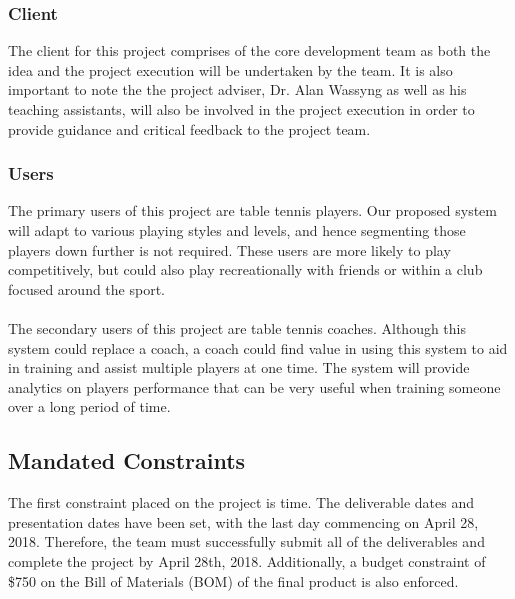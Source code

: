 \documentclass[11pt]{article}
\begin{document}
\subsubsection{Client}
The client for this project comprises of the core development team as both the idea and the project execution will be undertaken by the team. It is also important to note the the project adviser, Dr. Alan Wassyng as well as his teaching assistants, will also be involved in the project execution in order to provide guidance and critical feedback to the project team.
\subsubsection{Users}
The primary users of this project are table tennis players. Our proposed system will adapt to various playing styles and levels, and hence segmenting those players down further is not required. These users are more likely to play competitively, but could also play recreationally with friends or within a club focused around the sport. \\\\
The secondary users of this project are table tennis coaches. Although this system could replace a coach, a coach could find value in using this system to aid in training and assist multiple players at one time. The system will provide analytics on players performance that can be very useful when training someone over a long period of time.
\subsection{Mandated Constraints}
The first constraint placed on the project is time. The deliverable dates and presentation dates have been set, with the last day commencing on April 28, 2018. Therefore, the team must successfully submit all of the deliverables and complete the project by April 28th, 2018. Additionally, a budget constraint of \$750 on the Bill of Materials (BOM) of the final product is also enforced.
\end{document}
